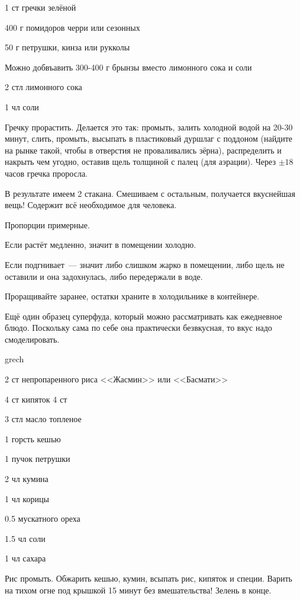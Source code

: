 {
\item 1 ст гречки зелёной
\item 400 г помидоров черри или сезонных 
\item 50 г петрушки, кинза или рукколы
\item Можно добвъавить 300-400  г брынзы вместо лимонного сока и соли
}{
\item 2 стл лимонного сока 
\item 1 чл соли
}{
Гречку прорастить. Делается это так: промыть, залить холодной водой на 20-30 минут, слить, промыть, высыпать в пластиковый дуршлаг с поддоном (найдите на рынке такой, чтобы в отверстия не проваливались зёрна), распределить и накрыть чем угодно, оставив щель толщиной с палец (для аэрации). Через $\pm18$ часов гречка проросла.

В результате имеем 2 стакана. Смешиваем с остальным, получается вкуснейшая вещь! Содержит всё необходимое для человека.
}{
\begin{advice}
    \item Пропорции примерные.
\item Если растёт медленно, значит в помещении холодно.
    \item Если подгнивает~--- значит либо слишком жарко в помещении, либо щель не оставили и она задохнулась, либо передержали в воде.
\item Проращивайте заранее, остатки храните в холодильнике в контейнере.
    \item Ещё один образец суперфуда, который можно рассматривать как ежедневное блюдо. Поскольку сама по себе она практически безвкусная, то вкус надо смоделировать.
\end{advice}}{grech}



{
\item 2 ст непропаренного риса <<Жасмин>> или <<Басмати>> 
\item 4 ст кипяток 4 ст
\item 3 стл масло топленое 
\item 1 горсть кешью 
\item 1 пучок петрушки
}{
\item 2 чл кумина
\item 1 чл корицы
\item 0.5 мускатного ореха
\item 1.5 чл соли
\item 1 чл сахара
}{
Рис промыть. Обжарить кешью, кумин, всыпать рис, кипяток и специи. Варить на тихом огне под крышкой 15 минут без вмешательства! Зелень в конце.
}{}{}



